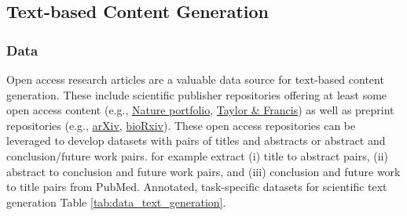 \subsection{Text-based Content Generation}
\label{sec:textgeneration}



\subsubsection{Data}


Open access research articles are a valuable data source for text-based content generation. These include scientific publisher repositories offering at least some open access content (e.g., \href{https://www.nature.com/nature-portfolio/for-authors/nature-research-journals}{Nature portfolio}, \href{https://www.tandfonline.com/}{Taylor \& Francis}) as well as preprint repositories (e.g., \href{https://arxiv.org/}{arXiv}, \href{https://www.biorxiv.org/}{bioRxiv}).
These open access repositories can be leveraged to develop datasets with pairs of titles and abstracts or abstract and conclusion/future work pairs. \citet{wang-etal-2019-paperrobot} for example extract (i) title to abstract pairs, (ii) abstract to conclusion and future work pairs, and (iii) conclusion and future work to title pairs from PubMed. Annotated, task-specific datasets for scientific text generation %
Table \ref{tab:data_text_generation}.  %


